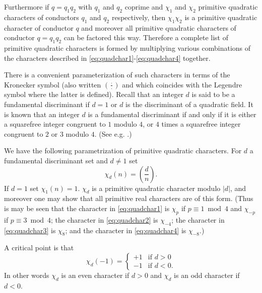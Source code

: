 \documentclass[12pt]{amsart}
\begin{document}
	Furthermore if $q = q_1 q_2$ with $q_1$ and $q_2$ coprime and $\chi_1$ and $\chi_2$ primitive quadratic characters of conductors $q_1$ and $q_2$ respectively, then $\chi_1\chi_2$ is a primitive quadratic character of conductor $q$ and moreover all primitive quadratic characters of conductor $q = q_1 q_2$ can be factored this way. Therefore a complete list of primitive quadratic characters is formed by multiplying various combinations of the characters described in \eqref{eq:quadchar1}-\eqref{eq:quadchar4} together.
	
	There is a convenient parameterization of such characters in terms of the Kronecker symbol (also written $(\tfrac \cdot \cdot )$ and which coincides with the Legendre symbol where the latter is defined). Recall that an integer $d$ is said to be a fundamental discriminant if $d=1$ or $d$ is the discriminant of a quadratic field. It is known that an integer $d$ is a fundamental discriminant if and only if it is either a squarefree integer congruent to $1$ modulo $4$, or $4$ times a squarefree integer congruent to $2$ or $3$ modulo $4$. (See e.g. \cite[Ch. 13.1]{IrRo}.)
	
	We have the following parametrization of primitive quadratic characters. For $d$ a fundamental discriminant set and $d\neq 1$ set
	$$
	\chi_d(n) = \left( \frac d n \right).
	$$
	If $d = 1$ set $\chi_1(n) = 1$. $\chi_d$ is a primitive quadratic character modulo $|d|$, and moreover one may show that all primitive real characters are of this form. (Thus is may be seen that the character in \eqref{eq:quadchar1} is $\chi_p$ if $p \equiv 1 \bmod 4$ and $\chi_{-p}$ if $p \equiv 3 \bmod 4$; the character in \eqref{eq:quadchar2} is $\chi_{-4}$; the character in \eqref{eq:quadchar3} is $\chi_8$; and the character in \eqref{eq:quadchar4} is $\chi_{-8}$.)
	
	A critical point is that
	$$
	\chi_d(-1) = \begin{cases}
		+1 & \mbox{if $d > 0$} \\
		-1 & \mbox{if $d < 0$}.
	\end{cases}
	$$
	In other words $\chi_d$ is an even character if $d > 0$ and $\chi_d$ is an odd character if $d < 0$. 
	
\end{document}
